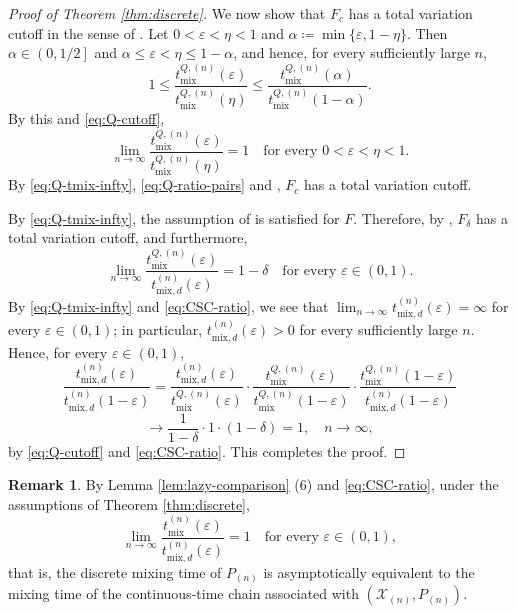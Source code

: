 \documentclass[a4paper, reqno, 11pt]{amsart}
\theoremstyle{definition}
\newtheorem{Rem}[Thm]{Remark}
\begin{document}
\begin{proof}[Proof of Theorem \ref{thm:discrete}]
We now show that $F_{c}$ has a total variation cutoff in the sense of \cite[Definition 2.1]{CSC2013}.
Let $0 < \varepsilon < \eta < 1$ and $\alpha \coloneqq \min\{\varepsilon, 1-\eta\}$.
Then $\alpha \in \left(0, 1/2\right]$ and $\alpha \le \varepsilon < \eta \le 1-\alpha$, and hence, for every sufficiently large $n$,
\[ 1 \le \frac{t_{\mathrm{mix}}^{Q,(n)}(\varepsilon)}{t_{\mathrm{mix}}^{Q,(n)}(\eta)} \le \frac{t_{\mathrm{mix}}^{Q,(n)}(\alpha)}{t_{\mathrm{mix}}^{Q,(n)}(1-\alpha)}. \]
By this and \eqref{eq:Q-cutoff},
\begin{equation}\label{eq:Q-ratio-pairs}
\lim_{n\to\infty} \frac{t_{\mathrm{mix}}^{Q,(n)}(\varepsilon)}{t_{\mathrm{mix}}^{Q,(n)}(\eta)} = 1 \quad \text{for every } 0 < \varepsilon < \eta < 1.
\end{equation}
By \eqref{eq:Q-tmix-infty}, \eqref{eq:Q-ratio-pairs} and \cite[Remark 2.1]{CSC2013},
$F_{c}$ has a total variation cutoff.

By \eqref{eq:Q-tmix-infty}, the assumption of \cite[Theorem 3.1]{CSC2013} is satisfied for $F$.
Therefore, by \cite[Theorem 3.1]{CSC2013}, $F_{\delta}$ has a total variation cutoff, and furthermore,
\begin{equation}\label{eq:CSC-ratio}
\lim_{n\to\infty} \frac{t_{\mathrm{mix}}^{Q,(n)}(\varepsilon)}{t_{\mathrm{mix},d}^{(n)}(\varepsilon)} = 1-\delta \quad \text{for every } \varepsilon \in (0,1).
\end{equation}
By \eqref{eq:Q-tmix-infty} and \eqref{eq:CSC-ratio},
we see that $\lim_{n\to\infty} t_{\mathrm{mix},d}^{(n)}(\varepsilon) = \infty$ for every $\varepsilon \in (0,1)$;
in particular, $t_{\mathrm{mix},d}^{(n)}(\varepsilon) > 0$ for every sufficiently large $n$.
Hence, for every $\varepsilon \in (0,1)$,
\[ \frac{t_{\mathrm{mix},d}^{(n)}(\varepsilon)}{t_{\mathrm{mix},d}^{(n)}(1-\varepsilon)}
= \frac{t_{\mathrm{mix},d}^{(n)}(\varepsilon)}{t_{\mathrm{mix}}^{Q,(n)}(\varepsilon)} \cdot
\frac{t_{\mathrm{mix}}^{Q,(n)}(\varepsilon)}{t_{\mathrm{mix}}^{Q,(n)}(1-\varepsilon)} \cdot
\frac{t_{\mathrm{mix}}^{Q,(n)}(1-\varepsilon)}{t_{\mathrm{mix},d}^{(n)}(1-\varepsilon)} \]
\[ \to \frac{1}{1-\delta} \cdot 1 \cdot (1-\delta) = 1, \quad n \to \infty, \]
by \eqref{eq:Q-cutoff} and \eqref{eq:CSC-ratio}.
This completes the proof.
\end{proof}

\begin{Rem}\label{rem:discrete-continuous}
By Lemma \ref{lem:lazy-comparison} (6) and \eqref{eq:CSC-ratio},
under the assumptions of Theorem \ref{thm:discrete},
\[ \lim_{n\to\infty} \frac{t_{\mathrm{mix}}^{(n)}(\varepsilon)}{t_{\mathrm{mix},d}^{(n)}(\varepsilon)} = 1 \quad \text{for every } \varepsilon \in (0,1), \]
that is, the discrete mixing time of $P_{(n)}$ is asymptotically equivalent to the mixing time of the continuous-time chain associated with $(\mathcal{X}_{(n)}, P_{(n)})$.
\end{Rem}
\end{document}
